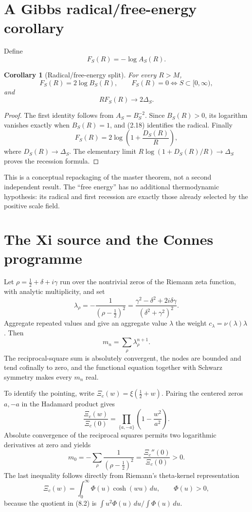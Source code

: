 \documentclass[11pt]{article}
\newtheorem{corollary}[theorem]{Corollary}
\theoremstyle{remark}
\begin{document}
\section{A Gibbs radical/free-energy corollary}
\label{sec:gibbs}

Define
\[
 F_S(R)=-\log A_S(R).
\]

\begin{corollary}[Radical/free-energy split]
For every $R>M$,
\[
 F_S(R)=2\log B_S(R),\qquad
 F_S(R)=0\Longleftrightarrow S\subset[0,\infty),
\]
and
\[
 RF_S(R)\longrightarrow2\Delta_S.
\]
\end{corollary}

\begin{proof}
The first identity follows from $A_S=B_S^{-2}$.  Since $B_S(R)>0$, its logarithm vanishes exactly
when $B_S(R)=1$, and (2.18) identifies the radical.  Finally
\[
 F_S(R)=2\log\left(1+\frac{D_S(R)}R\right),
\]
where $D_S(R)\to\Delta_S$.  The elementary limit
$R\log(1+D_S(R)/R)\to\Delta_S$ proves the recession formula.
\end{proof}

This is a conceptual repackaging of the master theorem, not a second independent result.  The
``free energy'' has no additional thermodynamic hypothesis: its radical and first recession are
exactly those already selected by the positive scale field.

\section{The Xi source and the Connes programme}
\label{sec:xi}

Let $\rho=\tfrac12+\delta+i\gamma$ run over the nontrivial zeros of the Riemann zeta function,
with analytic multiplicity, and set
\begin{equation}
 \lambda_\rho=-\frac1{(\rho-\tfrac12)^2}
 =\frac{\gamma^2-\delta^2+2i\delta\gamma}
 {\left(\delta^2+\gamma^2\right)^2}.
 \tag{8.1}
\end{equation}
Aggregate repeated values and give an aggregate value $\lambda$ the weight
$c_\lambda=\nu(\lambda)\lambda$.  Then
\[
 m_n=\sum_\rho\lambda_\rho^{n+1}.
\]
The reciprocal-square sum is absolutely convergent, the nodes are bounded and tend cofinally to
zero, and the functional equation together with Schwarz symmetry makes every $m_n$ real.

To identify the pointing, write $\Xi_c(w)=\xi(\tfrac12+w)$.  Pairing the centered zeros $a,-a$
in the Hadamard product gives
\[
 \frac{\Xi_c(w)}{\Xi_c(0)}=
 \prod_{\{a,-a\}}\left(1-\frac{w^2}{a^2}\right).
\]
Absolute convergence of the reciprocal squares permits two logarithmic derivatives at zero and
yields
\begin{equation}
 m_0=-\sum_\rho\frac1{(\rho-\tfrac12)^2}
 =\frac{\Xi_c''(0)}{\Xi_c(0)}>0.
 \tag{8.2}
\end{equation}
The last inequality follows directly from Riemann's theta-kernel representation
\[
 \Xi_c(w)=\int_0^\infty\Phi(u)\cosh(wu)\,du,
 \qquad \Phi(u)>0,
\]
because the quotient in (8.2) is
$\int u^2\Phi(u)\,du/\int\Phi(u)\,du$.
\end{document}
